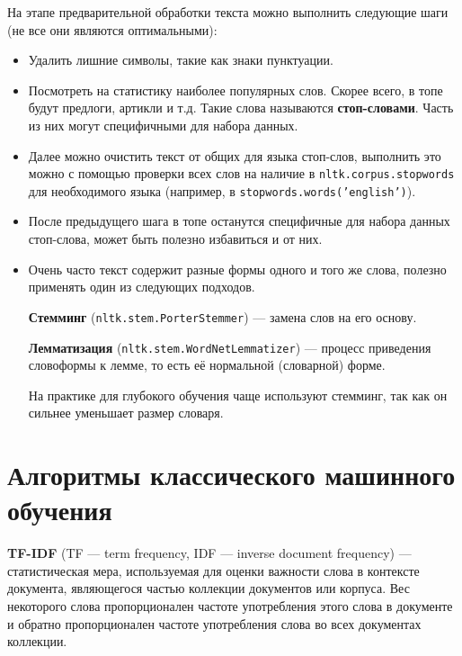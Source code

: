 На этапе предварительной обработки текста можно выполнить следующие шаги (не все они являются оптимальными):
\begin{itemize}
    \item Удалить лишние символы, такие как знаки пунктуации.
    \item Посмотреть на статистику наиболее популярных слов. Скорее всего, в топе будут предлоги, артикли и т.д. Такие слова называются \textbf{стоп-словами}. Часть из них могут специфичными для набора данных.
    \item Далее можно очистить текст от общих для языка стоп-слов, выполнить это можно с помощью проверки всех слов на наличие в \texttt{nltk.corpus.stopwords} для необходимого языка (например, в \texttt{stopwords.words('english')}).
    \item После предыдущего шага в топе останутся специфичные для набора данных стоп-слова, может быть полезно избавиться и от них.
    \item Очень часто текст содержит разные формы одного и того же слова, полезно применять один из следующих подходов.
    \begin{definition}
        \textbf{Стемминг} (\texttt{nltk.stem.PorterStemmer}) --- замена слов на его основу.
    \end{definition}
    \begin{definition}
        \textbf{Лемматизация} (\texttt{nltk.stem.WordNetLemmatizer}) --- процесс приведения словоформы к лемме, то есть её нормальной (словарной) форме.
    \end{definition}
    \begin{remark}
        На практике для глубокого обучения чаще используют стемминг, так как он сильнее уменьшает размер словаря.
    \end{remark}
\end{itemize}

\section{Алгоритмы классического машинного обучения}

\begin{definition}
    \textbf{TF-IDF} (TF — term frequency, IDF — inverse document frequency) --- статистическая мера, используемая для оценки важности слова в контексте документа, являющегося частью коллекции документов или корпуса. Вес некоторого слова пропорционален частоте употребления этого слова в документе и обратно пропорционален частоте употребления слова во всех документах коллекции.
\end{definition}

